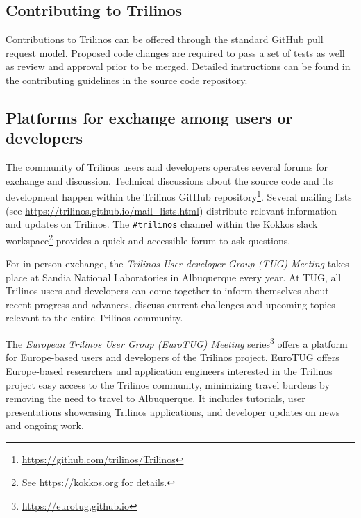 
\subsection{Contributing to Trilinos}

Contributions to Trilinos can be offered through the standard GitHub pull request model. Proposed code changes are required to pass a set of tests as well as review and approval prior to be merged. Detailed instructions can be found in the contributing guidelines in the source code repository.


\subsection{Platforms for exchange among users or developers}

The community of Trilinos users and developers operates several forums for exchange and discussion.
Technical discussions about the source code and its development happen within the Trilinos GitHub repository\footnote{\url{https://github.com/trilinos/Trilinos}}.
Several mailing lists (see \url{https://trilinos.github.io/mail_lists.html}) distribute relevant information and updates on Trilinos.
The \texttt{\#trilinos} channel within the Kokkos slack workspace\footnote{See \url{https://kokkos.org} for details.} provides a quick and accessible forum to ask questions.

For in-person exchange, the \emph{Trilinos User-developer Group (TUG) Meeting} takes place at Sandia National Laboratories in Albuquerque every year. At TUG, all Trilinos users and developers can come together to inform themselves about recent progress and advances,
discuss current challenges and upcoming topics relevant to the entire Trilinos community.

The \emph{European Trilinos User Group (EuroTUG) Meeting} series\footnote{\url{https://eurotug.github.io}}
offers a platform for Europe-based users and developers of the Trilinos project. 
EuroTUG offers Europe-based researchers and application engineers interested in the Trilinos project easy access to the Trilinos community, minimizing travel burdens by removing the need to travel to Albuquerque.
It includes tutorials, user presentations showcasing Trilinos applications, and developer updates on news and ongoing work.

